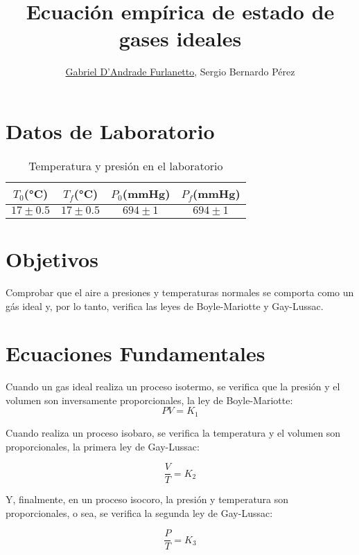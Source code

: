 \documentclass[a4paper,12pt]{article}
\begin{document}
\title{Ecuación empírica de estado de gases ideales}
\author{\underline{Gabriel D'Andrade Furlanetto}, Sergio Bernardo Pérez} 
\maketitle

\newpage
\thispagestyle{empty}
\mbox{}
\newpage 


\section{Datos de Laboratorio}
\begin{table}[H]
\centering
  \centering
  \caption{Temperatura y presión en el laboratorio}
  \label{bar}
  \begin{tabular}{|c|c|c|c|}
  \hline
    $T_0$(°C) & $T_f$(°C) & $P_0$(mmHg) & $P_f$(mmHg) \\ 
    \hline
    $17\pm 0.5$&$17\pm 0.5$ & $694 \pm 1$&$ 694 \pm 1$ \\ 
    \hline 
  \end{tabular}
\end{table}

\section{Objetivos}
Comprobar que el aire a presiones y temperaturas normales se comporta como un gás ideal y, por lo tanto, verifica las leyes de Boyle-Mariotte y Gay-Lussac.
\section{Ecuaciones Fundamentales}
Cuando un gas ideal realiza un proceso isotermo, se verifica que la presión y el volumen son inversamente proporcionales, la ley de Boyle-Mariotte:
\begin{equation}
  PV = K_1
\end{equation}

Cuando realiza un proceso isobaro, se verifica la temperatura y el volumen son proporcionales, la primera ley de Gay-Lussac:

\begin{equation}
  \frac{V}{T} = K_2
\end{equation}

Y, finalmente, en un proceso isocoro, la presión y temperatura son proporcionales, o sea, se verifica la segunda ley de Gay-Lussac:

\begin{equation}
  \frac{P}{T} = K_3
\end{equation}
\end{document}
